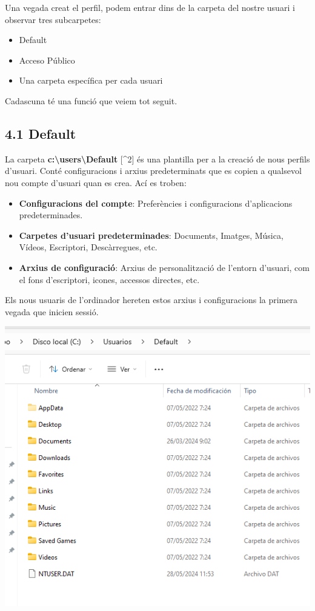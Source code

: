 \documentclass[
  a4paper,
]{article}
\providecommand{\tightlist}{%
  \setlength{\itemsep}{0pt}\setlength{\parskip}{0pt}}
\begin{document}
Una vegada creat el perfil, podem entrar dins de la carpeta del nostre
usuari i observar tres subcarpetes:

\begin{itemize}
\tightlist
\item
  Default
\item
  Acceso Público
\item
  Una carpeta específica per cada usuari
\end{itemize}

Cadascuna té una funció que veiem tot seguit.

\subsection{4.1 Default}\label{default}

La carpeta \textbf{c:\textbackslash users\textbackslash Default}
{[}\^{}2{]} és una plantilla per a la creació de nous perfils d'usuari.
Conté configuracions i arxius predeterminats que es copien a qualsevol
nou compte d'usuari quan es crea. Ací es troben:

\begin{itemize}
\tightlist
\item
  \textbf{Configuracions del compte}: Preferències i configuracions
  d'aplicacions predeterminades.
\item
  \textbf{Carpetes d'usuari predeterminades}: Documents, Imatges,
  Música, Vídeos, Escriptori, Descàrregues, etc.
\item
  \textbf{Arxius de configuració}: Arxius de personalització de l'entorn
  d'usuari, com el fons d'escriptori, icones, accessos directes, etc.
\end{itemize}

Els nous usuaris de l'ordinador hereten estos arxius i configuracions la
primera vegada que inicien sessió.

\includegraphics{png/CarpetesDefault.png}
\end{document}
